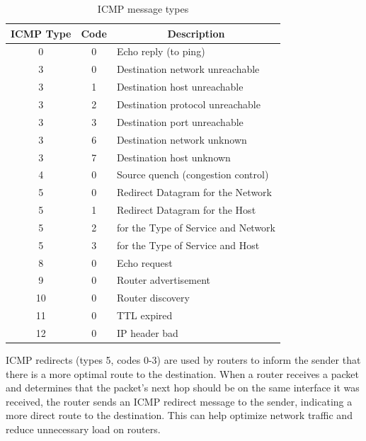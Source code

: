 {
\setlength{\tabcolsep}{32pt}

\begin{table}[h!]
    \centering
    \captionsetup{justification=centering}
    \begin{tabularx}{\textwidth}{ccl}
        \toprule
        \textbf{ICMP Type} & \textbf{Code} & \multicolumn{1}{c}{\textbf{Description}} \\
        \midrule
        0 & 0 & Echo reply (to ping) \\
        3 & 0 & Destination network unreachable \\
        3 & 1 & Destination host unreachable \\
        3 & 2 & Destination protocol unreachable \\
        3 & 3 & Destination port unreachable \\
        3 & 6 & Destination network unknown \\
        3 & 7 & Destination host unknown \\
        4 & 0 & Source quench (congestion control) \\
        5 & 0 & Redirect Datagram for the Network \\
        5 & 1 & Redirect Datagram for the Host \\
        5 & 2 & \>\> for the Type of Service and Network \\
        5 & 3 & \>\> for the Type of Service and Host \\
        8 & 0 & Echo request \\
        9 & 0 & Router advertisement \\
       10 & 0 & Router discovery \\
       11 & 0 & TTL expired \\
       12 & 0 & IP header bad \\
        \bottomrule
    \end{tabularx}
    \caption{ICMP message types \cite{Kurose2017}}
    \label{tab:icmp}
\end{table}
}

\clearpage
\noindent ICMP redirects (types 5, codes 0-3) are used by routers to inform the sender that there is a more optimal route to the destination. When a router receives a packet and determines that the packet's next hop should be on the same interface it was received, the router sends an ICMP redirect message to the sender, indicating a more direct route to the destination. This can help optimize network traffic and reduce unnecessary load on routers.

